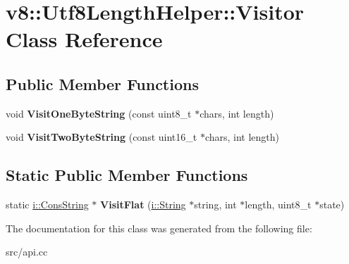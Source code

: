 \hypertarget{classv8_1_1_utf8_length_helper_1_1_visitor}{}\section{v8\+:\+:Utf8\+Length\+Helper\+:\+:Visitor Class Reference}
\label{classv8_1_1_utf8_length_helper_1_1_visitor}
\subsection*{Public Member Functions}
\begin{DoxyCompactItemize}
\item 
\hypertarget{classv8_1_1_utf8_length_helper_1_1_visitor_ae0aef11aceb740bf3ee80ecc88961379}{}void {\bfseries Visit\+One\+Byte\+String} (const uint8\+\_\+t $\ast$chars, int length)\label{classv8_1_1_utf8_length_helper_1_1_visitor_ae0aef11aceb740bf3ee80ecc88961379}

\item 
\hypertarget{classv8_1_1_utf8_length_helper_1_1_visitor_a6cbaec22819779f9984d3e8f62cdc9c3}{}void {\bfseries Visit\+Two\+Byte\+String} (const uint16\+\_\+t $\ast$chars, int length)\label{classv8_1_1_utf8_length_helper_1_1_visitor_a6cbaec22819779f9984d3e8f62cdc9c3}

\end{DoxyCompactItemize}
\subsection*{Static Public Member Functions}
\begin{DoxyCompactItemize}
\item 
\hypertarget{classv8_1_1_utf8_length_helper_1_1_visitor_ace99ffd273ae10ad88bdd4ed95e8a36b}{}static \hyperlink{classv8_1_1internal_1_1_cons_string}{i\+::\+Cons\+String} $\ast$ {\bfseries Visit\+Flat} (\hyperlink{classv8_1_1internal_1_1_string}{i\+::\+String} $\ast$string, int $\ast$length, uint8\+\_\+t $\ast$state)\label{classv8_1_1_utf8_length_helper_1_1_visitor_ace99ffd273ae10ad88bdd4ed95e8a36b}

\end{DoxyCompactItemize}


The documentation for this class was generated from the following file\+:\begin{DoxyCompactItemize}
\item 
src/api.\+cc\end{DoxyCompactItemize}

